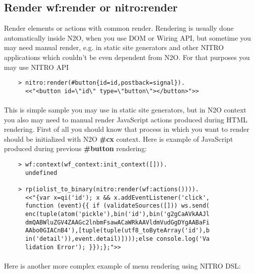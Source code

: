 \newpage
\subsection{Render {\bf wf:render} or {\bf nitro:render}}
Render elements or actions with common render. Rendering is usually
done automatically inside N2O, when you use DOM or Wiring API, but sometime you may
need manual render, e.g. in static site generators and other NITRO applications
which couldn't be even dependent from N2O. For that purposes you may use NITRO API

\vspace{1\baselineskip}
\begin{lstlisting}
    > nitro:render(#button{id=id,postback=signal}).
      <<"<button id=\"id\" type=\"button\"></button>">>
\end{lstlisting}
\vspace{1\baselineskip}

\paragraph{}
This is simple sample you may use in static site generators, but in N2O context
you also may need to manual render JavaScript actions produced during HTML rendering.
First of all you should know that process in which you want to render should be
initialized with N2O {\bf \#cx} context. Here is example of JavaScript
produced during previous {\bf \#button} rendering:

\vspace{1\baselineskip}
\begin{lstlisting}
    > wf:context(wf_context:init_context([])).
      undefined

    > rp(iolist_to_binary(nitro:render(wf:actions()))).
      <<"{var x=qi('id'); x && x.addEventListener('click',
      function (event){{ if (validateSources([])) ws.send(
      enc(tuple(atom('pickle'),bin('id'),bin('g2gCaAVkAAJl
      dmQABWluZGV4ZAAGc2lnbmFsawACaWRkAAVldmVudGgDYgAABaFi
      AAbo0GIACnB4'),[tuple(tuple(utf8_toByteArray('id'),b
      in('detail')),event.detail)])));else console.log('Va
      lidation Error'); }});};">>
\end{lstlisting}
\vspace{1\baselineskip}

\newpage
\paragraph{}
Here is another more complex example of menu rendering using NITRO DSL:

